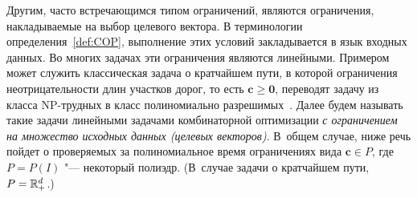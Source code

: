 Другим, часто встречающимся типом ограничений, являются ограничения, накладываемые на выбор целевого вектора. В терминологии определения~\ref{def:COP}, выполнение этих условий закладывается в язык входных данных.
Во многих задачах эти ограничения являются линейными.
Примером может служить классическая задача о кратчайшем пути, в которой ограничения неотрицательности длин участков дорог, то есть $\bm{c} \ge \bm{0}$, переводят задачу из класса NP-трудных в класс полиномиально разрешимых~\cite[sec.~7.5b, 8.6b]{SchrijverCO:2003}.
Далее будем называть такие задачи линейными задачами комбинаторной оптимизации \emph{с ограничением на множество исходных данных (целевых векторов)}.
В~общем случае, ниже речь пойдет о проверяемых за полиномиальное время ограничениях вида $\bm{c} \in P$, где $P=P(I)$ "--- некоторый полиэдр.
(В~случае задачи о кратчайшем пути, $P = \mathbb{R}^d_+$.)

